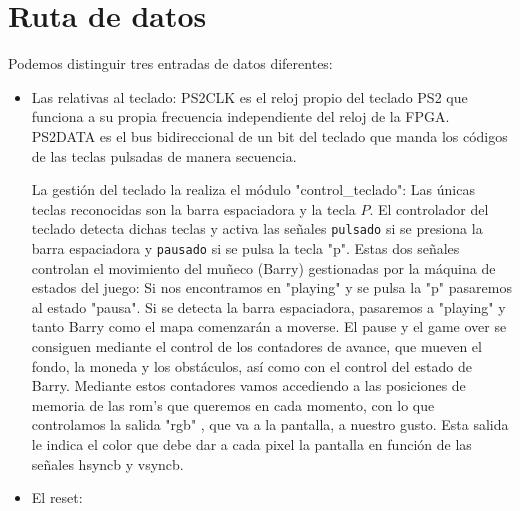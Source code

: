 \documentclass[11pt, a4paper, spanish, openright, twoside]{book}
\begin{document}
\newpage
\mbox{}
\thispagestyle{empty}						%
\newpage


\tableofcontents 							%

\newpage


\vspace{3cm}


\section{Ruta de datos}
	Podemos distinguir tres entradas de datos diferentes:
	\begin{itemize}	
	\item Las relativas al teclado: PS2CLK es el reloj propio del teclado PS2 que funciona a  su propia frecuencia independiente 
 	del reloj de la FPGA. PS2DATA es el bus bidireccional de un bit del teclado que manda los códigos de las teclas pulsadas de manera secuencia.
	
	La gestión del teclado la realiza el módulo "control\_teclado":	Las únicas teclas reconocidas son la barra espaciadora y la tecla $P$. El controlador del teclado detecta dichas teclas y activa las señales \texttt{pulsado} si se presiona la barra espaciadora y \texttt{pausado} si se pulsa la tecla "p".	
	Estas dos señales controlan el movimiento del muñeco (Barry) gestionadas por la máquina de estados del juego: Si nos encontramos en "playing" y se pulsa la "p"  pasaremos al estado "pausa". Si se detecta la barra espaciadora, pasaremos
	 a "playing" y tanto Barry como el mapa comenzarán a moverse. El pause y el game over se consiguen mediante el control de los contadores de avance, que mueven el fondo, la moneda y los obstáculos, así como con el control del estado de Barry.
	Mediante estos contadores vamos accediendo a las posiciones de memoria de las rom's que queremos en cada momento, con lo que controlamos la salida "rgb" , que va a la pantalla, a nuestro gusto. Esta salida le indica el color que debe dar a cada pixel
	 la pantalla en función de las señales hsyncb y vsyncb.

	\item El reset:
	
\end{itemize}
\end{document}
